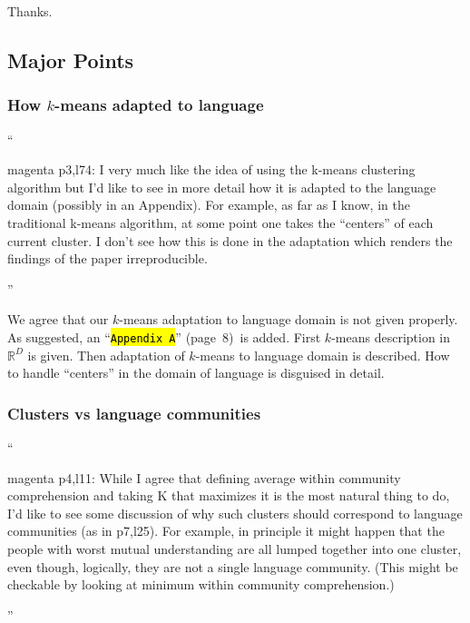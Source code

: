 \documentclass[10.5pt]{amsart}
\newcommand{\hbColorReviewer}{magenta}
\newcommand{\hbColorManuscript}{violet}
\newenvironment{hbReviewer}
	{\list{}{\leftmargin=2cm\rightmargin=1cm}\item[]``\begin{footnotesize}
	\begin{color}{\hbColorReviewer}}	
	{\end{color}\end{footnotesize}''\endlist}
\newcommand{\hbMRefP}[2]{``\texttt{{\color{\hbColorManuscript}\hl{#1}}}''  (page~#2)}
\newcommand{\hbMAppendix}{\hbMRefP{Appendix A}{8}}
\begin{document}
Thanks.




\subsection{Major Points}




\subsubsection{How $k$-means adapted to language}
\begin{hbReviewer}
	p3,l74:
	I very much like the idea of using the k-means clustering algorithm but
	I'd like to see in more detail how it is adapted to the language domain 
	(possibly in an Appendix).
	For example, as far as I know, in the traditional k-means algorithm,
	at some point one takes the ``centers'' of each current cluster.
	I don't see how this is done in the adaptation 
	which renders the findings of the paper irreproducible. 
\end{hbReviewer}

We agree that our $k$-means adaptation to language domain 
is not given properly.
As suggested, an \hbMAppendix\ is added. 
First $k$-means description in $\mathbb{R}^{D}$ is given.
Then adaptation of $k$-means to language domain is described. 
How to handle ``centers''  in the domain of language is disguised in detail.




\subsubsection{Clusters vs language communities}
\label{sec:ClustersLanguageCommunities}
\begin{hbReviewer}
	p4,l11:
	While I agree that defining average within community comprehension and
	taking K that maximizes it is the most natural thing to do, I'd like to see some
	discussion of why such clusters should correspond to language communities 
	 (as in p7,l25).
	For example, in principle it might happen that 
	 the people with worst mutual understanding
	are all lumped together into one cluster, even though, logically, 
	 they are not a single
	language community.
	(This might be checkable by looking at minimum 
	 within community comprehension.)
\end{hbReviewer}
\end{document}
